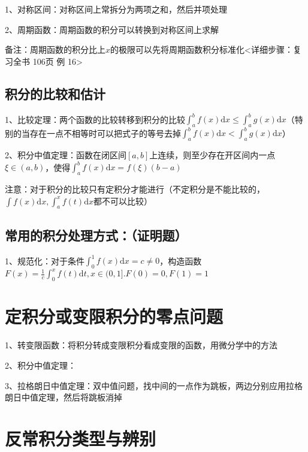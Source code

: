 1、对称区间：对称区间上常拆分为两项之和，然后并项处理

2、周期函数：周期函数的积分可以转换到对称区间上求解

备注：周期函数的积分比上$x$的极限可以先将周期函数积分标准化<详细步骤：复习全书 106页 例 16>



\subsection{积分的比较和估计}

1、比较定理：两个函数的比较转移到积分的比较$\int_{a}^{b} f(x) \mathrm{d} x \leqslant \int_{a}^{b} g(x) \mathrm{d} x$（特别的当存在一点不相等时可以把式子的等号去掉$\int_{a}^{b} f(x) \mathrm{d} x<\int_{a}^{b} g(x) \mathrm{d} x$）

2、积分中值定理：函数在闭区间$[a,b]$上连续，则至少存在开区间内一点$\xi \in (a,b)$，使得$\int_{a}^{b} f(x) \mathrm{d} x=f(\xi)(b-a)$

注意：对于积分的比较只有定积分才能进行（不定积分是不能比较的，$\int f(x) \mathrm{d} x,\int_{a}^{x} f(t) \mathrm{d}x$都不可以比较）



\subsection{常用的积分处理方式：（证明题）}

1、规范化：对于条件$\int_{0}^{1} f(x) \mathrm{d} x=c \neq 0$，构造函数$F(x)=\frac{1}{c} \int_{0}^{x} f(t) \mathrm{d} t, x \in(0,1] . F(0)=0, F(1)=1$

\section{定积分或变限积分的零点问题}

1、转变限函数：将积分转成变限积分看成变限的函数，用微分学中的方法

2、积分中值定理：

3、拉格朗日中值定理：双中值问题，找中间的一点作为跳板，两边分别应用拉格朗日中值定理，然后将跳板消掉

\section{反常积分类型与辨别}



